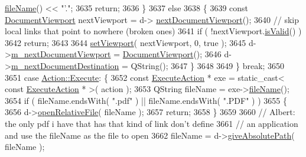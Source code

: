 \begin{DoxyCode}
      \hyperlink{classOkular_1_1GotoAction_a310a286fa9e6e3cae3417d7d537274b1}{fileName}() << \textcolor{stringliteral}{"'."};
3635                 \textcolor{keywordflow}{return};
3636             \}
3637             \textcolor{keywordflow}{else}
3638             \{
3639                 \textcolor{keyword}{const} \hyperlink{classOkular_1_1DocumentViewport}{DocumentViewport} nextViewport = d->
      \hyperlink{classOkular_1_1DocumentPrivate_a53d9d28d2ad9555b577ab0c9b1a1c142}{nextDocumentViewport}();
3640                 \textcolor{comment}{// skip local links that point to nowhere (broken ones)}
3641                 \textcolor{keywordflow}{if} ( !nextViewport.\hyperlink{classOkular_1_1DocumentViewport_a13161b17f2d0b68bf033955f81d41584}{isValid}() )
3642                     \textcolor{keywordflow}{return};
3643 
3644                 \hyperlink{classOkular_1_1Document_a1afaf8b8b5cb1e715949024fb75bb767}{setViewport}( nextViewport, 0, \textcolor{keyword}{true} );
3645                 d->\hyperlink{classOkular_1_1DocumentPrivate_af6aae2128fb788ae1693699506a86c0d}{m\_nextDocumentViewport} = 
      \hyperlink{classOkular_1_1DocumentViewport}{DocumentViewport}();
3646                 d->\hyperlink{classOkular_1_1DocumentPrivate_a0c531a03865395da325584dbae6e1efe}{m\_nextDocumentDestination} = QString();
3647             \}
3648 
3649             \} \textcolor{keywordflow}{break};
3650 
3651         \textcolor{keywordflow}{case} \hyperlink{classOkular_1_1Action_abe474735af30ea76105595533df9ec47a04ece2216c075107b03f6d91739252c2}{Action::Execute}: \{
3652             \textcolor{keyword}{const} \hyperlink{classOkular_1_1ExecuteAction}{ExecuteAction} * exe  = \textcolor{keyword}{static\_cast<} \textcolor{keyword}{const }
      \hyperlink{classOkular_1_1ExecuteAction}{ExecuteAction} * \textcolor{keyword}{>}( action );
3653             QString fileName = exe->\hyperlink{classOkular_1_1ExecuteAction_a9deef6fa77e658cc0bf65fb811209c28}{fileName}();
3654             \textcolor{keywordflow}{if} ( fileName.endsWith( \textcolor{stringliteral}{".pdf"} ) || fileName.endsWith( \textcolor{stringliteral}{".PDF"} ) )
3655             \{
3656                 d->\hyperlink{classOkular_1_1DocumentPrivate_a4853d128c2eb810795bf2cd4ca3665e2}{openRelativeFile}( fileName );
3657                 \textcolor{keywordflow}{return};
3658             \}
3659 
3660             \textcolor{comment}{// Albert: the only pdf i have that has that kind of link don't define}
3661             \textcolor{comment}{// an application and use the fileName as the file to open}
3662             fileName = d->\hyperlink{classOkular_1_1DocumentPrivate_a1c665a65d08f7b032bba757b298e26a6}{giveAbsolutePath}( fileName );

\end{DoxyCode}
